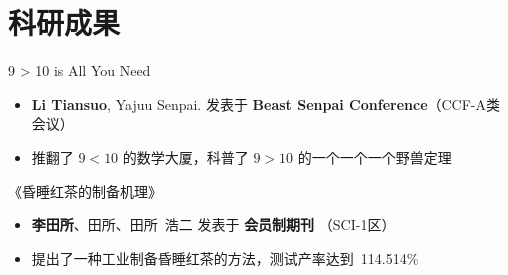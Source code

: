 \documentclass[11pt]{article}
\newlength{\iconwidth}
\begin{document}
    \begin{minipage}[t]{\textwidth}
    \section[科研成果]{\quad 科研成果}

    9 > 10 is All You Need
    \begin{itemize}
        \item \textbf{Li Tiansuo}, Yajuu Senpai. \hfill 发表于 \textbf{Beast Senpai Conference}（CCF-A类会议）
        \item 推翻了 $9 < 10$ 的数学大厦，科普了 $9 > 10$ 的一个一个一个野兽定理
    \end{itemize}

    \vspace{0.5em}
    《昏睡红茶的制备机理》
    \begin{itemize}
        \item  \textbf{李田所}、田所、田所\ 浩二 \hfill 发表于 \textbf{会员制期刊} （SCI-1区）
        \item 提出了一种工业制备昏睡红茶的方法，测试产率达到\ 114.514\%
    \end{itemize}
    
    \vspace{1.2em}
    \end{minipage}
\end{document}
